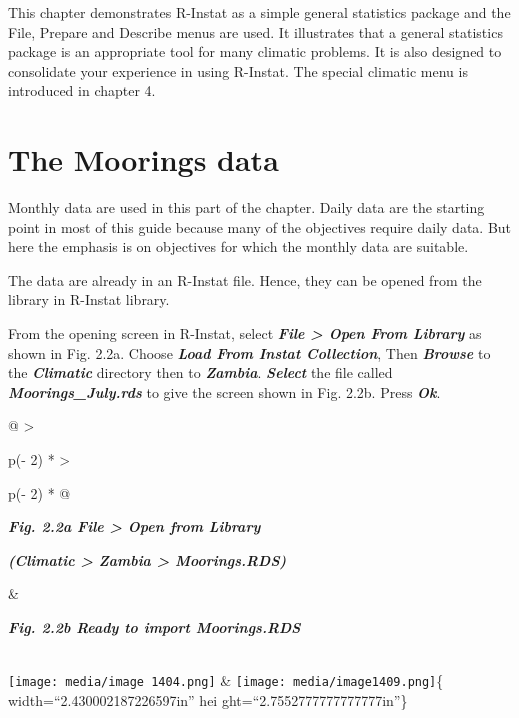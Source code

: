 \documentclass[
  letterpaper,
  DIV=11,
  numbers=noendperiod]{scrreprt}
\begin{document}
This chapter demonstrates R-Instat as a simple general statistics
package and the File, Prepare and Describe menus are used. It
illustrates that a general statistics package is an appropriate tool for
many climatic problems. It is also designed to consolidate your
experience in using R-Instat. The special climatic menu is introduced in
chapter 4.

\section{The Moorings data}\label{the-moorings-data}

Monthly data are used in this part of the chapter. Daily data are the
starting point in most of this guide because many of the objectives
require daily data. But here the emphasis is on objectives for which the
monthly data are suitable.

The data are already in an R-Instat file. Hence, they can be opened from
the library in R-Instat library.

From the opening screen in R-Instat, select \textbf{\emph{File
\textgreater{} Open From Library}} as shown in Fig. 2.2a. Choose
\textbf{\emph{Load From Instat Collection}}, Then \textbf{\emph{Browse}}
to the \textbf{\emph{Climatic}} directory then to
\textbf{\emph{Zambia}}. \textbf{\emph{Select}} the file called
\textbf{\emph{Moorings\_July.rds}} to give the screen shown in Fig.
2.2b. Press \textbf{\emph{Ok}}.

\begin{longtable}[]{@{}
  >{\raggedright\arraybackslash}p{(\columnwidth - 2\tabcolsep) * }
  >{\raggedright\arraybackslash}p{(\columnwidth - 2\tabcolsep) * }@{}}
\toprule\noalign{}
\begin{minipage}[b]{\linewidth}\raggedright
\textbf{\emph{Fig. 2.2a File \textgreater{} Open from Library}}

\textbf{\emph{(Climatic \textgreater{} Zambia \textgreater{}
Moorings.RDS)}}
\end{minipage} & \begin{minipage}[b]{\linewidth}\raggedright
\textbf{\emph{Fig. 2.2b Ready to import Moorings.RDS}}
\end{minipage} \\
\midrule\noalign{}
\endhead
\bottomrule\noalign{}
\endlastfoot
\texttt{[image: media/image 1404.png]}
& \texttt{[image: media/image1409.png]}\{ width=``2.430002187226597in''
hei ght=``2.7552777777777777in''\} \\
\end{longtable}
\end{document}
